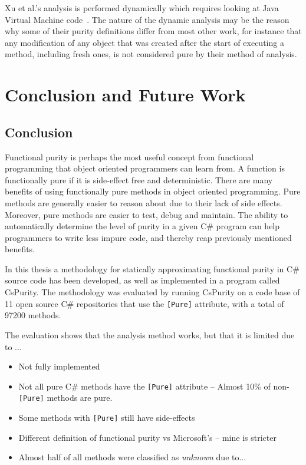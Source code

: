 \documentclass[a4paper,12pt]{article}
\begin{document}
Xu et al.'s analysis is performed dynamically which requires looking at Java Virtual Machine code~\cite{xu2007dynamic}. The nature of the dynamic analysis may be the reason why some of their purity definitions differ from most other work, for instance that any modification of any object that was created after the start of executing a method, including fresh ones, is not considered pure by their method of analysis.

\section{Conclusion and Future Work} \label{sec:Conclusion and future Work} %

\subsection{Conclusion} \label{sub:Conclusion}


Functional purity is perhaps the most useful concept from functional programming that object oriented programmers can learn from. A function is functionally pure if it is side-effect free and deterministic. There are many benefits of using functionally pure methods in object oriented programming. Pure methods are generally easier to reason about due to their lack of side effects. Moreover, pure methods are easier to test, debug and maintain. The ability to automatically determine the level of purity in a given C\# program can help programmers to write less impure code, and thereby reap previously mentioned benefits.

In this thesis a methodology for statically approximating functional purity in C\# source code has been developed, as well as implemented in a program called CsPurity. The methodology was evaluated by running CsPurity on a code base of 11 open source C\# repositories that use the \texttt{[Pure]} attribute, with a total of 97200 methods.

The evaluation shows that the analysis method works, but that it is limited due to ...

\begin{itemize}
  \item Not fully implemented
  \item Not all pure C\# methods have the \texttt{[Pure]} attribute -- Almost 10\% of non-\texttt{[Pure]} methods are pure.
  \item Some methods with \texttt{[Pure]} still have side-effects
  \item Different definition of functional purity vs Microsoft's -- mine is stricter
  \item Almost half of all methods were classified as \textit{unknown} due to...
\end{itemize}
\end{document}
